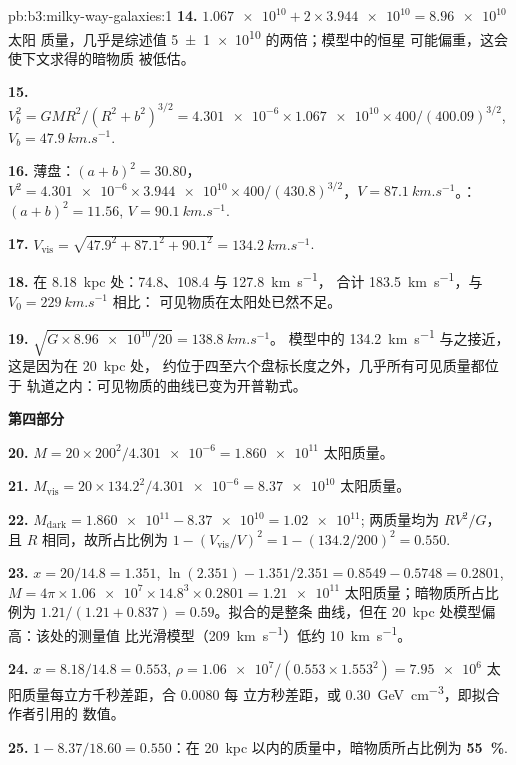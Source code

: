 \begin{solution}{pb:b3:milky-way-galaxies:1}
\textbf{14.} $\num{1.067e10} + 2\times\num{3.944e10} = \num{8.96e10}$ 太阳
质量，几乎是综述值 \num[separate-uncertainty=true]{5 \pm 1 e10} 的两倍；模型中的恒星
可能偏重，这会使下文求得的暗物质
被低估。

\textbf{15.} $V_b^2 = GMR^2/(R^2 + b^2)^{3/2} = \num{4.301e-6}\times\num{1.067e10}
\times400/(400.09)^{3/2}$, $V_b = \qty{47.9}{km.s^{-1}}$.

\textbf{16.} 薄盘：$(a + b)^2 = 30.80$，$V^2 = \num{4.301e-6}\times\num{3.944e10}
\times400/(430.8)^{3/2}$，$V = \qty{87.1}{km.s^{-1}}$。：
$(a + b)^2 = 11.56$, $V = \qty{90.1}{km.s^{-1}}$.

\textbf{17.} $V_\mathrm{vis} = \sqrt{47.9^2 + 87.1^2 + 90.1^2} =
\qty{134.2}{km.s^{-1}}$.

\textbf{18.} 在 \qty{8.18}{kpc} 处：74.8、108.4 与 \qty{127.8}{km.s^{-1}}，
合计 \qty{183.5}{km.s^{-1}}，与 $V_0 = \qty{229}{km.s^{-1}}$ 相比：
可见物质在太阳处已然不足。

\textbf{19.} $\sqrt{G\times\num{8.96e10}/20} = \qty{138.8}{km.s^{-1}}$。
模型中的 \qty{134.2}{km.s^{-1}} 与之接近，这是因为在 \qty{20}{kpc} 处，
约位于四至六个盘标长度之外，几乎所有可见质量都位于
轨道之内：可见物质的曲线已变为开普勒式。

\textbf{第四部分}

\textbf{20.} $M = 20\times200^2/\num{4.301e-6} = \num{1.860e11}$ 太阳质量。

\textbf{21.} $M_\mathrm{vis} = 20\times134.2^2/\num{4.301e-6} = \num{8.37e10}$
太阳质量。

\textbf{22.} $M_\mathrm{dark} = \num{1.860e11} - \num{8.37e10} = \num{1.02e11}$;
两质量均为 $RV^2/G$，且 $R$ 相同，故所占比例为
$1 - (V_\mathrm{vis}/V)^2 = 1 - (134.2/200)^2 = \num{0.550}$.

\textbf{23.} $x = 20/14.8 = 1.351$, $\ln(2.351) - 1.351/2.351 = 0.8549 - 0.5748
= 0.2801$, $M = 4\pi\times\num{1.06e7}\times14.8^3\times0.2801 =
\num{1.21e11}$ 太阳质量；暗物质所占比例为
$1.21/(1.21 + 0.837) = \num{0.59}$。拟合的是整条
曲线，但在 \qty{20}{kpc} 处模型偏高：该处的测量值
比光滑模型（\qty{209}{km.s^{-1}}）低约 \qty{10}{km.s^{-1}}。

\textbf{24.} $x = 8.18/14.8 = 0.553$, $\rho = \num{1.06e7}/(0.553\times1.553^2)
= \num{7.95e6}$ 太阳质量每立方千秒差距，合 \num{0.0080} 每
立方秒差距，或 \qty{0.30}{GeV.cm^{-3}}，即拟合作者引用的
数值。

\textbf{25.} $1 - 8.37/18.60 = \num{0.550}$：在
\qty{20}{kpc} 以内的质量中，暗物质所占比例为
\textbf{\qty[text-series-to-math=true]{55}{\percent}}.
\end{solution}
